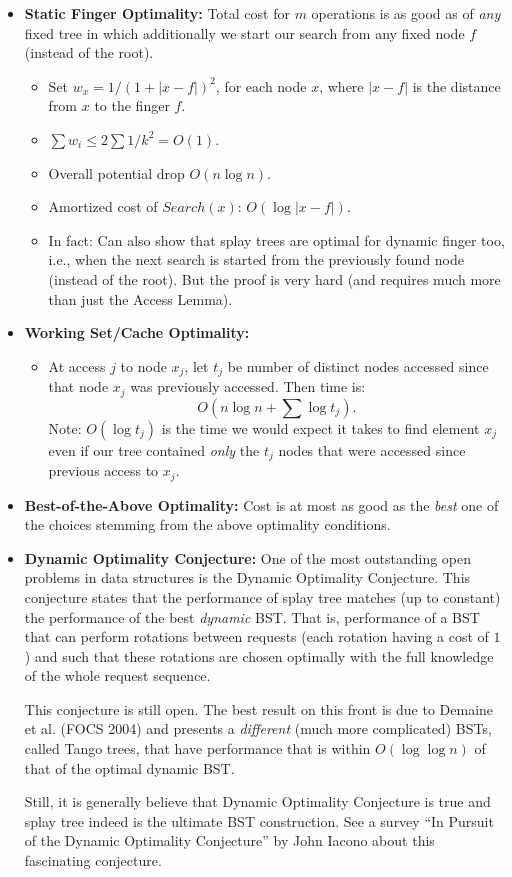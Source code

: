 \documentclass{article}
\begin{document}
\begin{itemize}
\item {\bf Static Finger Optimality:} Total cost for $m$ operations is as good as of {\em any} fixed tree in which additionally we start our search from any fixed node $f$ (instead of the root). 

\begin{itemize}
\item Set $w_x=1/(1+|x-f|)^2$, for each node $x$, where $|x-f|$ is the distance from $x$ to the finger $f$. 
\item $\sum w_i \le 2 \sum 1/k^2 = O(1)$.
\item Overall potential drop $O(n\log n)$.
\item Amortized cost of $Search(x)$: $O(\log |x-f|)$.
\item In fact: Can also show that splay trees are optimal for dynamic finger too, i.e., when the next search is started from the previously found node (instead of the root). But the proof is very hard (and requires much more than just the Access Lemma).
\end{itemize}


\item {\bf Working Set/Cache Optimality:} 
\begin{itemize}
\item At access $j$ to node $x_j$, let $t_j$ be number of distinct
  nodes accessed since that node $x_j$ was previously accessed.  Then time is:
  \[
   O(n\log n+\sum
  \log t_j).
  \]
 Note: $O(\log t_j)$ is the time we would expect it takes to find element $x_j$ even if our tree contained {\em only} the $t_j$  nodes that were accessed since previous access to $x_j$.
\end{itemize}

\item {\bf Best-of-the-Above Optimality:}  Cost is at most as good as the {\em best}  one of the choices stemming from the above optimality conditions. 


\item {\bf Dynamic Optimality Conjecture:}  One of the most outstanding open problems in data structures is the Dynamic Optimality Conjecture. This conjecture states that the performance of splay tree matches (up to constant) the performance of the best {\em dynamic} BST. That is, performance of a BST that can perform rotations between requests (each rotation having a cost of $1$) and such that these rotations are chosen optimally with the full knowledge of the whole request sequence.

This conjecture is still open. The best result on this front is due to Demaine et al. (FOCS 2004) and presents a {\em different} (much more complicated) BSTs, called Tango trees, that have performance that is within $O(\log \log n)$ of that of the optimal dynamic BST.

Still, it is generally believe that Dynamic Optimality Conjecture is true and splay tree indeed is the ultimate BST construction.  See a survey ``In Pursuit of the Dynamic Optimality Conjecture'' by John Iacono about this fascinating conjecture.

\end{itemize}
\end{document}
